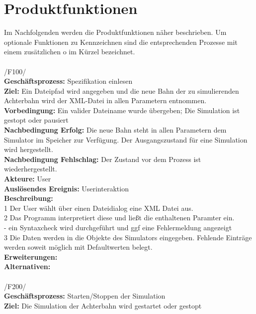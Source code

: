 
\chapter{Produktfunktionen}

Im Nachfolgenden werden die Produktfunktionen näher beschrieben. Um optionale Funktionen zu Kennzeichnen sind die entsprechenden Prozesse mit einem zusätzlichen o im Kürzel bezeichnet.
\\ \\ 

/F100/\\
\textbf{Geschäftsprozess:} Spezifikation einlesen \\
\textbf{Ziel:} Ein Dateipfad wird angegeben und die neue Bahn der zu simulierenden Achterbahn wird der XML-Datei in allen Parametern entnommen. \\
\textbf{Vorbedingung:} Ein valider Dateiname wurde übergeben; Die Simulation ist gestopt oder pausiert \\
\textbf{Nachbedingung Erfolg:} Die neue Bahn steht in allen Parametern dem Simulator im Speicher zur Verfügung. Der Ausgangszustand für eine Simulation wird hergestellt. \\
\textbf{Nachbedingung Fehlschlag:} Der Zustand vor dem Prozess ist wiederhergestellt. \\
\textbf{Akteure:} User \\
\textbf{Auslösendes Ereignis:} Userinteraktion \\
\textbf{Beschreibung:} \\
1 Der User wählt über einen Dateidialog eine XML Datei aus. \\
2 Das Programm interpretiert diese und ließt die enthaltenen Paramter ein. \\
- ein Syntaxcheck wird durchgeführt und ggf eine Fehlermeldung angezeigt\\
3 Die Daten werden in die Objekte des Simulators eingegeben. Fehlende Einträge werden soweit möglich mit Defaultwerten belegt.\\
\textbf{Erweiterungen:}\\
\textbf{Alternativen:}\\
\\
/F200/\\
\textbf{Geschäftsprozess:} Starten/Stoppen der Simulation\\
\textbf{Ziel:} Die Simulation der Achterbahn wird gestartet oder gestopt\\
